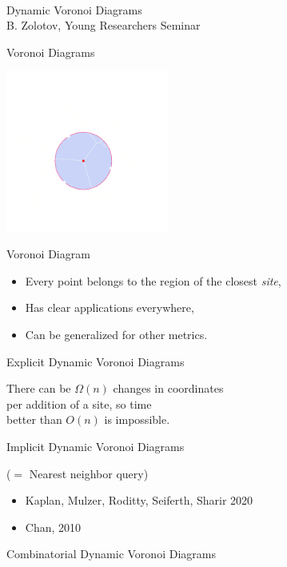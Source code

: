 \documentclass[17pt]{extarticle}
\newcommand{\newslide}[1]{\newpage \begin{center} \large #1 \end{center}}
\begin{document}
\ \\ [1cm]

\begin{center} {\Large Dynamic Voronoi Diagrams} \bigskip \\
	{\large B. Zolotov, Young Researchers Seminar} \end{center}

\newslide{Voronoi Diagrams} \vspace{-6mm}

\begin{center}
	\includegraphics[height=5.3cm]{figs/voronoiCircle-dark}
\end{center}

\newslide{Voronoi Diagram}

\begin{itemize}
	\item Every point belongs to the region of the closest {\it site},
	\item Has clear applications everywhere,
	\item Can be generalized for other metrics.
\end{itemize}

\newslide{Explicit Dynamic Voronoi Diagrams}

There can be \(Ω (n)\) changes in coordinates \\
per addition of a site, so time \\
better than \(O (n)\) is impossible.

\newslide{Implicit Dynamic Voronoi Diagrams}

($=$ Nearest neighbor query)

\begin{itemize}
	\item Kaplan, Mulzer, Roditty, Seiferth, Sharir 2020
	\item Chan, 2010
\end{itemize}

\newslide{Combinatorial Dynamic Voronoi Diagrams}
\end{document}
